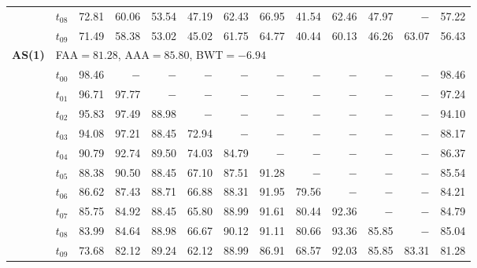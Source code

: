 \begin{table}[ht]
\begin{tabular}{@{}l l r r r r r r r r r r r@{}}
 & $t_{08}$ & 72.81 & 60.06 & 53.54 & 47.19 & 62.43 & 66.95 & 41.54 & 62.46 & 47.97 & $-$ & 57.22 \\
 & $t_{09}$ & 71.49 & 58.38 & 53.02 & 45.02 & 61.75 & 64.77 & 40.44 & 60.13 & 46.26 & 63.07 & 56.43 \\
\midrule
\multirow{11}{*}{\textbf{AS(1)}} & \multicolumn{12}{l}{\quad\small FAA$=81.28$,\; AAA$=85.80$,\; BWT$=-6.94$} \\
 & $t_{00}$ & 98.46 & $-$ & $-$ & $-$ & $-$ & $-$ & $-$ & $-$ & $-$ & $-$ & 98.46 \\
 & $t_{01}$ & 96.71 & 97.77 & $-$ & $-$ & $-$ & $-$ & $-$ & $-$ & $-$ & $-$ & 97.24 \\
 & $t_{02}$ & 95.83 & 97.49 & 88.98 & $-$ & $-$ & $-$ & $-$ & $-$ & $-$ & $-$ & 94.10 \\
 & $t_{03}$ & 94.08 & 97.21 & 88.45 & 72.94 & $-$ & $-$ & $-$ & $-$ & $-$ & $-$ & 88.17 \\
 & $t_{04}$ & 90.79 & 92.74 & 89.50 & 74.03 & 84.79 & $-$ & $-$ & $-$ & $-$ & $-$ & 86.37 \\
 & $t_{05}$ & 88.38 & 90.50 & 88.45 & 67.10 & 87.51 & 91.28 & $-$ & $-$ & $-$ & $-$ & 85.54 \\
 & $t_{06}$ & 86.62 & 87.43 & 88.71 & 66.88 & 88.31 & 91.95 & 79.56 & $-$ & $-$ & $-$ & 84.21 \\
 & $t_{07}$ & 85.75 & 84.92 & 88.45 & 65.80 & 88.99 & 91.61 & 80.44 & 92.36 & $-$ & $-$ & 84.79 \\
 & $t_{08}$ & 83.99 & 84.64 & 88.98 & 66.67 & 90.12 & 91.11 & 80.66 & 93.36 & 85.85 & $-$ & 85.04 \\
 & $t_{09}$ & 73.68 & 82.12 & 89.24 & 62.12 & 88.99 & 86.91 & 68.57 & 92.03 & 85.85 & 83.31 & 81.28 \\
\bottomrule
\end{tabular}
\end{table}

